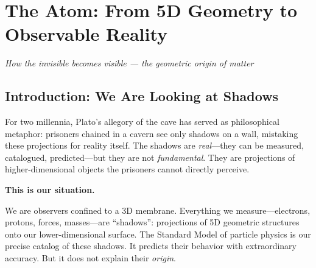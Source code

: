 % 

\chapter{The Atom: From 5D Geometry to Observable Reality}
\label{ch:atom}

\begin{center}
\textit{How the invisible becomes visible --- the geometric origin of matter}
\end{center}

\vspace{2em}


\section{Introduction: We Are Looking at Shadows}
\label{sec:introduction}

For two millennia, Plato's allegory of the cave has served as philosophical metaphor: prisoners chained in a cavern see only shadows on a wall, mistaking these projections for reality itself. The shadows are \textit{real}---they can be measured, catalogued, predicted---but they are not \textit{fundamental}. They are projections of higher-dimensional objects the prisoners cannot directly perceive.

\textbf{This is our situation.}

We are observers confined to a 3D membrane. Everything we measure---electrons, protons, forces, masses---are ``shadows'': projections of 5D geometric structures onto our lower-dimensional surface. The Standard Model of particle physics is our precise catalog of these shadows. It predicts their behavior with extraordinary accuracy. But it does not explain their \textit{origin}.

